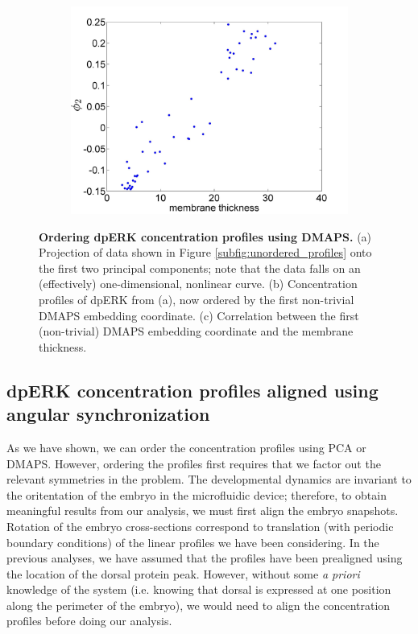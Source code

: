 \documentclass[10pt]{article}
\begin{document}
\begin{figure}[H]
\begin{subfigure}{0.3\textwidth}
\includegraphics[width=\textwidth]{DMAPS_time_corr}
\caption{}
\end{subfigure}
\caption{{\bf Ordering dpERK concentration profiles using DMAPS.} (a) Projection of data shown in Figure \ref{subfig:unordered_profiles} onto the first two principal components; note that the data falls on an (effectively) one-dimensional, nonlinear curve. 
(b) Concentration profiles of dpERK from (a), now ordered by the first non-trivial DMAPS embedding coordinate.
(c) Correlation between the first (non-trivial) DMAPS embedding coordinate and the membrane thickness.}
\label{fig:DMAPS_ordering}
\end{figure}

\subsection*{dpERK concentration profiles aligned using angular synchronization}

As we have shown, we can order the concentration profiles using PCA or DMAPS.
%
However, ordering the profiles first requires that we factor out the relevant symmetries in the problem.
%
The developmental dynamics are invariant to the oritentation of the embryo in the microfluidic device; therefore, to obtain meaningful results from our analysis, we must first align the embryo snapshots.
%
Rotation of the embryo cross-sections correspond to translation (with periodic boundary conditions) of the linear profiles we have been considering.
%
In the previous analyses, we have assumed that the profiles have been prealigned using the location of the dorsal protein peak.
%
However, without some {\em a priori} knowledge of the system (i.e. knowing that dorsal is expressed at one position along the perimeter of the embryo), we would need to align the concentration profiles before doing our analysis.
\end{document}
